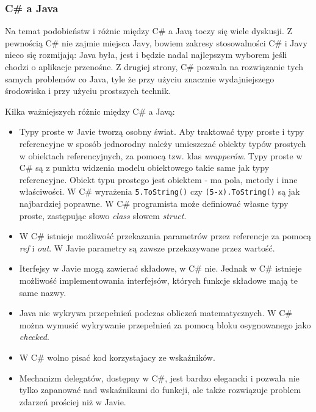 \subsubsection{C\# a Java}

Na temat podobieństw i różnic między C\# a Javą toczy się wiele dyskusji. Z pewnością C\# nie zajmie
miejsca Javy, bowiem zakresy stosowalności C\# i Javy nieco się rozmijają: Java była, jest i będzie
nadal najlepszym wyborem jeśli chodzi o aplikacje przenośne. Z drugiej strony, C\# pozwala na rozwiązanie
tych samych problemów co Java, tyle że przy użyciu znacznie wydajniejszego środowiska i przy użyciu
prostszych technik. 

Kilka ważniejszych różnic między C\# a Javą:

\begin{itemize}
\item Typy proste w Javie tworzą osobny świat. Aby traktować typy proste i typy referencyjne w sposób jednorodny
należy umieszczać obiekty typów prostych w obiektach referencyjnych, za pomocą tzw. klas {\em wrapperów}.
Typy proste w C\# są z punktu widzenia modelu obiektowego takie same jak typy referencyjne. Obiekt typu
prostego jest obiektem - ma pola, metody i inne właściwości. W C\# wyrażenia {\tt 5.ToString()} czy
{\tt (5-x).ToString()} są jak najbardziej poprawne. W C\# programista może definiować własne typy proste, 
zastępując słowo {\em class} słowem {\em struct}.

\item W C\# istnieje możliwość przekazania parametrów przez referencje za pomocą {\em ref} i {\em out}. W Javie
parametry są zawsze przekazywane przez wartość.

\item Iterfejsy w Javie mogą zawierać składowe, w C\# nie. Jednak w C\# istnieje możliwość implementowania 
interfejsów, których funkcje składowe mają te same nazwy.

\item Java nie wykrywa przepełnień podczas obliczeń matematycznych. W C\# można wymusić wykrywanie przepełnień
za pomocą bloku osygnowanego jako {\em checked}.

\item W C\# wolno pisać kod korzystajacy ze wskaźników.

\item Mechanizm delegatów, dostępny w C\#, jest bardzo elegancki i pozwala nie tylko
zapanować nad wskaźnikami do funkcji, ale także rozwiązuje problem zdarzeń prościej niż w Javie.

\end{itemize}

